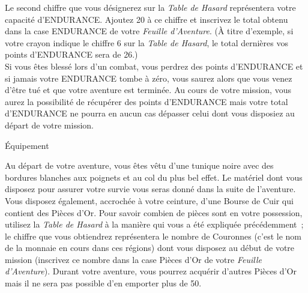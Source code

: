 \documentclass[10pt]{book}
\begin{document}
Le second chiffre que vous désignerez sur la \textit{Table de Hasard} représentera
votre capacité d'ENDURANCE. Ajoutez 20 à ce chiffre et inscrivez le total obtenu
dans la case ENDURANCE de votre \textit{Feuille d'Aventure}. (À titre d'exemple,
si votre crayon indique le chiffre 6 sur la \textit{Table de Hasard}, le total dernières
vos points d'ENDURANCE sera de 26.)\\

Si vous êtes blessé lors d'un combat, vous perdrez des points d'ENDURANCE et si
jamais votre ENDURANCE tombe à zéro, vous saurez alors que vous venez d'être tué et
que votre aventure est terminée. Au cours de votre mission, vous aurez la possibilité
de récupérer des points d'ENDURANCE mais votre total d'ENDURANCE ne pourra en aucun
cas dépasser celui dont vous disposiez au départ de votre mission.


\begin{center}
  Équipement
\end{center}

Au départ de votre aventure, vous êtes vêtu d'une tunique noire avec des bordures blanches
aux poignets et au col du plus bel effet. Le matériel
dont vous disposez pour assurer votre survie vous seras donné dans la suite de
l'aventure. Vous disposez également, accrochée à votre ceinture, d'une Bourse
de Cuir qui contient des Pièces d'Or. Pour savoir combien de pièces sont en votre possession,
utilisez la \textit{Table de Hasard} à la manière qui vous a été expliquée précédemment~;
le chiffre que vous obtiendrez représentera le nombre de Couronnes (c'est le nom de la monnaie
en cours dans ces régions) dont vous disposez au début de votre mission (inscrivez ce nombre
dans la case Pièces d'Or de votre \textit{Feuille d'Aventure}). Durant votre aventure,
vous pourrez acquérir d'autres Pièces d'Or mais il ne sera pas possible d'en emporter plus
de 50.\\
\end{document}
